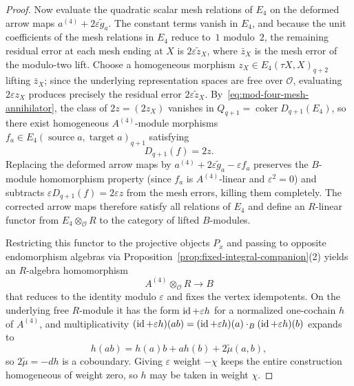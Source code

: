 \begin{proof}
Now evaluate the quadratic scalar mesh relations of $E_4$ on the deformed arrow maps $a^{(4)}+2\varepsilon\widetilde g_a$. The constant terms vanish in $E_4$, and because the unit coefficients of the mesh relations in $E_4$ reduce to~$1$ modulo~$2$, the remaining residual error at each mesh ending at $X$ is $2\varepsilon\widetilde z_X$, where $\bar z_X$ is the mesh error of the modulo-two lift. Choose a homogeneous morphism $z_X\in E_4(\tau X,X)_{q+2}$ lifting $\bar z_X$; since the underlying representation spaces are free over $\mathcal O$, evaluating $2\varepsilon z_X$ produces precisely the residual error $2\varepsilon\widetilde z_X$. By~\eqref{eq:mod-four-mesh-annihilator}, the class of $2z=(2z_X)$ vanishes in $Q_{q+1}=\operatorname{coker}D_{q+1}(E_4)$, so there exist homogeneous $A^{(4)}$-module morphisms $f_a\in E_4(\operatorname{source}a,\operatorname{target}a)_{q+1}$ satisfying
\[
  D_{q+1}(f)=2z.
\]
Replacing the deformed arrow maps by $a^{(4)}+2\varepsilon\widetilde g_a-\varepsilon f_a$ preserves the $B$-module homomorphism property (since $f_a$ is $A^{(4)}$-linear and $\varepsilon^2=0$) and subtracts $\varepsilon D_{q+1}(f)=2\varepsilon z$ from the mesh errors, killing them completely. The corrected arrow maps therefore satisfy all relations of $E_4$ and define an $R$-linear functor from $E_4\otimes_{\mathcal O}R$ to the category of lifted $B$-modules.

Restricting this functor to the projective objects $P_x$ and passing to opposite endomorphism algebras via Proposition~\ref{prop:fixed-integral-companion}(2) yields an $R$-algebra homomorphism
\[
  A^{(4)}\otimes_{\mathcal O}R\longrightarrow B
\]
that reduces to the identity modulo $\varepsilon$ and fixes the vertex idempotents. On the underlying free $R$-module it has the form $\operatorname{id}+\varepsilon h$ for a normalized one-cochain $h$ of $A^{(4)}$, and multiplicativity $(\operatorname{id}+\varepsilon h)(ab)=(\operatorname{id}+\varepsilon h)(a)\cdot_B(\operatorname{id}+\varepsilon h)(b)$ expands to
\[
  h(ab)=h(a)b+ah(b)+2\widetilde\mu(a,b),
\]
so $2\widetilde\mu=-dh$ is a coboundary. Giving $\varepsilon$ weight $-\chi$ keeps the entire construction homogeneous of weight zero, so $h$ may be taken in weight $\chi$.
\end{proof}

